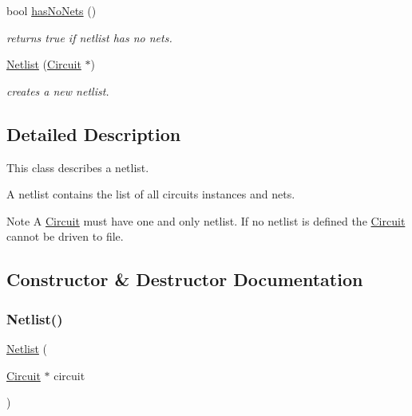\begin{DoxyCompactItemize}
\mbox{\label{class_open_chams_1_1_netlist_a36089e1b3a3f2d3f7c9dcc8e3c3bd6d8}} 
bool \mbox{\hyperlink{class_open_chams_1_1_netlist_a36089e1b3a3f2d3f7c9dcc8e3c3bd6d8}{has\+No\+Nets}} ()
\begin{DoxyCompactList}\small\item\em returns true if netlist has no nets. \end{DoxyCompactList}\item 
\mbox{\hyperlink{class_open_chams_1_1_netlist_a202a04ceb6a7c0619590b329ba7773bd}{Netlist}} (\mbox{\hyperlink{class_open_chams_1_1_circuit}{Circuit}} $\ast$)
\begin{DoxyCompactList}\small\item\em creates a new netlist. \end{DoxyCompactList}\end{DoxyCompactItemize}


\subsection{Detailed Description}
This class describes a netlist.

A netlist contains the list of all circuit\textquotesingle{}s instances and nets.

\begin{DoxyNote}{Note}
A \mbox{\hyperlink{class_open_chams_1_1_circuit}{Circuit}} must have one and only netlist. If no netlist is defined the \mbox{\hyperlink{class_open_chams_1_1_circuit}{Circuit}} cannot be driven to file. 
\end{DoxyNote}


\subsection{Constructor \& Destructor Documentation}
\mbox{\label{class_open_chams_1_1_netlist_a202a04ceb6a7c0619590b329ba7773bd}} 
\subsubsection{\texorpdfstring{Netlist()}{Netlist()}}
{\footnotesize\ttfamily \mbox{\hyperlink{class_open_chams_1_1_netlist}{Netlist}} (\begin{DoxyParamCaption}\item[{\mbox{\hyperlink{class_open_chams_1_1_circuit}{Circuit}} $\ast$}]{circuit }\end{DoxyParamCaption})}



